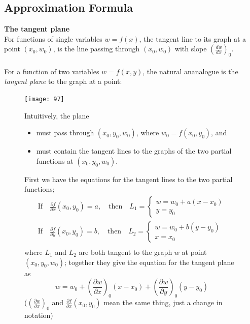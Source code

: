 \documentclass{report}
\begin{document}
\subsection{Approximation Formula}%
\textbf{The tangent plane}\\
For functions of single variables $w=f(x)$, the tangent line to its graph at a point $(x_0,w_0)$, is the line
passing through $(x_0,w_0)$ with slope $\left(\frac{dw}{dx}\right)_0$.\\
\vspace{1mm}\\
For a function of two variables $w=f(x,y)$, the natural ananalogue is the \textit{tangent plane} to the graph 
at a point:
\begin{figure}[h]
\begin{center}
\texttt{[image: 97]}\\
\end{center}
Intuitively, the plane
\begin{itemize}
\item must pass through $(x_0,y_0,w_0)$, where $w_0=f(x_0,y_0)$, and 
\item must contain the tangent lines to the graphs of the two partial functions at $(x_0,y_0,w_0)$.
\end{itemize}
First we have the equations for the tangent lines to the two partial functions; 
\begin{align*}
\text{If}\quad\frac{\partial f}{\partial x}(x_0,y_0)=a,\quad
\text{then}\quad L_1=\begin{cases}
w=w_0+a(x-x_0)\\
y=y_0
\end{cases}\\
\text{If}\quad\frac{\partial f}{\partial y}(x_0,y_0)=b,\quad
\text{then}\quad L_2=\begin{cases}
w=w_0+b(y-y_0)\\
x=x_0
\end{cases}\\
\end{align*}
where $L_1$ and $L_2$ are both tangent to the graph $w$ at point $(x_0,y_0,w_0)$; together they 
give the equation for the tangent plane as
\begin{equation*}
w=w_0+\left(\frac{\partial w}{\partial x}\right)_0(x-x_0)+
\left(\frac{\partial w}{\partial y}\right)_0(y-y_0)
\end{equation*}
($\left(\frac{\partial w}{\partial x}\right)_0$ and 
$\frac{\partial f}{\partial x}(x_0,y_0)$ mean the same thing, just a change in notation)
\end{figure}\\
\end{document}
